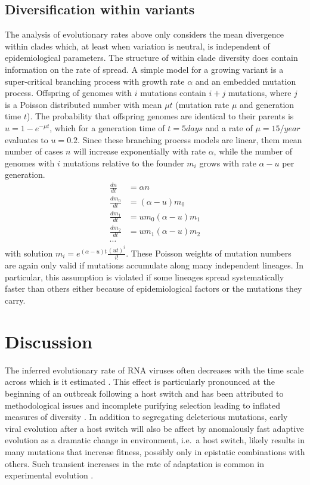 \documentclass[aps,rmp, twocolumn]{revtex4}
\begin{document}
\subsection*{Diversification within variants}
The analysis of evolutionary rates above only considers the mean divergence within clades which, at least when variation is neutral, is independent of epidemiological parameters.
The structure of within clade diversity does contain information on the rate of spread.
A simple model for a growing variant is a super-critical branching process with growth rate $\alpha$ and an embedded mutation process.
Offspring of genomes with $i$ mutations contain $i+j$ mutations, where $j$ is a Poisson distributed number with mean $\mu t$ (mutation rate $\mu$ and generation time $t$).
The probability that offspring genomes are identical to their parents is $u = 1-e^{-\mu t}$, which for a generation time of $t=5days$ and a rate of $\mu = 15/year$ evaluates to $u=0.2$.
Since these branching process models are linear, them mean number of cases $n$ will increase exponentially with rate $\alpha$, while the number of genomes with $i$ mutations relative to the founder $m_i$ grows with rate $\alpha - u$ per generation.
\begin{equation}
    \begin{split}
        \frac{dn}{dt} &= \alpha n \\
        \frac{dm_0}{dt} &= (\alpha - u) m_0 \\
        \frac{dm_1}{dt} &= u m_0 (\alpha - u) m_1 \\
        \frac{dm_2}{dt} &= u m_1 (\alpha - u) m_2 \\
        \cdots
    \end{split}
\end{equation}
with solution $m_i = e^{(\alpha - u)t} \frac{(ut)^i}{i!}$.
These Poisson weights of mutation numbers are again only valid if mutations accumulate along many independent lineages.
In particular, this assumption is violated if some lineages spread systematically faster than others either because of epidemiological factors or the mutations they carry.


\section*{Discussion}
The inferred evolutionary rate of RNA viruses often decreases with the time scale across which is it estimated \citep{wertheim_purifying_2011,ghafari_prisoner_2021}.
This effect is particularly pronounced at the beginning of an outbreak following a host switch and has been attributed to methodological issues and incomplete purifying selection leading to inflated measures of diversity \citep{meyer_time_2015,ghafari_purifying_2022}.
In addition to segregating deleterious mutations, early viral evolution after a host switch will also be affect by anomalously fast adaptive evolution as a dramatic change in environment, i.e.~a host switch, likely results in many mutations that increase fitness, possibly only in epistatic combinations with others.
Such transient increases in the rate of adaptation is common in experimental evolution \citep{elena_virus_2007}.
\end{document}
